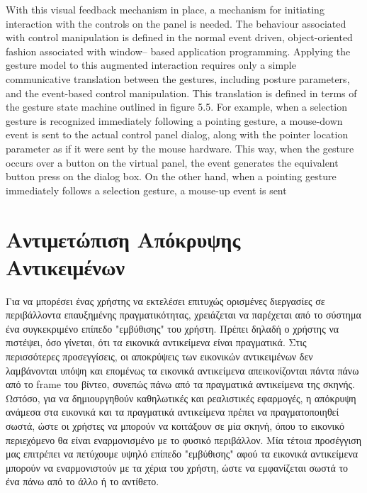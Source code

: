 With this visual feedback mechanism in place, a mechanism for initiating interaction with the controls on the panel is needed. The behaviour associated with control manipulation is defined in the normal event driven, object-oriented fashion associated with window– based application programming. Applying the gesture model to this augmented interaction requires only a simple communicative translation between the gestures, including posture parameters, and the event-based control manipulation. This translation is defined in terms of the gesture state machine outlined in figure 5.5. For example, when a selection gesture is recognized immediately following a pointing gesture, a mouse-down event is sent to the actual control panel dialog, along with the pointer location parameter as if it were sent by the mouse hardware. This way, when the gesture occurs over a button on the virtual panel, the event generates the equivalent button press on the dialog box. On the other hand, when a pointing gesture immediately follows a selection gesture, a mouse-up event is sent


\section{Αντιμετώπιση Απόκρυψης Αντικειμένων} \label{s:occlusion}



Για να μπορέσει ένας χρήστης να εκτελέσει επιτυχώς ορισμένες διεργασίες σε περιβάλλοντα επαυξημένης πραγματικότητας, χρειάζεται να παρέχεται από το σύστημα ένα συγκεκριμένο επίπεδο "εμβύθισης" του χρήστη. Πρέπει δηλαδή ο χρήστης να πιστέψει, όσο γίνεται, ότι τα εικονικά αντικείμενα είναι πραγματικά. 
Στις περισσότερες προσεγγίσεις, οι αποκρύψεις των εικονικών αντικειμένων δεν λαμβάνονται υπόψη και επομένως τα εικονικά αντικείμενα απεικονίζονται πάντα πάνω από το frame του βίντεο, συνεπώς πάνω από τα πραγματικά αντικείμενα της σκηνής. 
Ωστόσο, για να δημιουργηθούν καθηλωτικές και ρεαλιστικές εφαρμογές, η απόκρυψη ανάμεσα στα εικονικά και τα πραγματικά αντικείμενα πρέπει να πραγματοποιηθεί σωστά, ώστε οι χρήστες να μπορούν να κοιτάξουν σε μία σκηνή, όπου το εικονικό περιεχόμενο θα είναι εναρμονισμένο με το φυσικό περιβάλλον. Μία τέτοια προσέγγιση μας επιτρέπει να πετύχουμε υψηλό επίπεδο "εμβύθισης" αφού τα εικονικά αντικείμενα μπορούν να εναρμονιστούν με τα χέρια του χρήστη, ώστε να εμφανίζεται σωστά το ένα πάνω από το άλλο ή το αντίθετο. 

